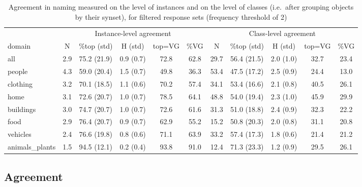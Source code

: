 \begin{table}
\begin{tabular}{lccccc|ccccc}
\toprule
 & \multicolumn{5}{c|}{Instance-level agreement} & \multicolumn{5}{c}{Class-level agreement}\\ 
          domain &    N &         \%top (std) &          H (std) & top=VG &   \%VG &     N &         \%top (std) &          H (std) & top=VG &   \%VG \\
\midrule
            all &  2.9 &  75.2 (21.9) &  0.9 (0.7) &   72.8 &  62.8 &  29.7 &  56.4 (21.5) &  2.0 (1.0) &   32.7 &  23.4 \\
            \midrule
                     people &  4.3 &  59.0 (20.4) &  1.5 (0.7) &   49.8 &  36.3 &  53.4 &  47.5 (17.2) &  2.5 (0.9) &   24.4 &  13.0 \\
       clothing &  3.2 &  70.1 (18.5) &  1.1 (0.6) &   70.2 &  57.4 &  34.1 &  53.4 (16.6) &  2.1 (0.8) &   40.5 &  26.1 \\
           home &  3.1 &  72.6 (20.7) &  1.0 (0.7) &   78.5 &  64.1 &  48.8 &  54.0 (19.4) &  2.3 (1.0) &   45.9 &  29.9 \\
                 buildings &  3.0 &  74.7 (20.7) &  1.0 (0.7) &   72.6 &  61.6 &  31.3 &  51.0 (18.8) &  2.4 (0.9) &   32.3 &  22.2 \\
           food &  2.9 &  76.4 (20.7) &  0.9 (0.7) &   62.9 &  55.2 &  15.2 &  50.8 (20.3) &  2.0 (0.8) &   31.1 &  20.8 \\
                  vehicles &  2.4 &  76.6 (19.8) &  0.8 (0.6) &   71.1 &  63.9 &  33.2 &  57.4 (17.3) &  1.8 (0.6) &   21.4 &  21.2 \\
 animals\_plants &  1.5 &  94.5 (12.1) &  0.2 (0.4) &   93.8 &  91.0 &  12.4 &  71.3 (23.3) &  1.2 (0.9) &   29.5 &  26.1 \\
\bottomrule
\end{tabular}

\caption{Agreement in naming measured on the level of instances and on the level of \vgenome classes (i.e.\ after grouping objects by their \vg synset), for filtered response sets (frequency threshold of 2)}
\label{tab:agree}
\end{table}

\subsection{Agreement}

